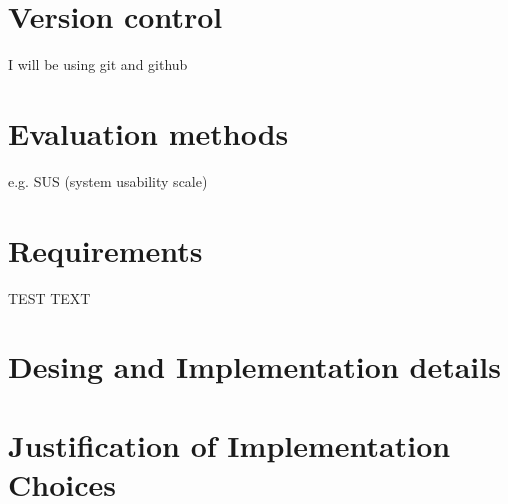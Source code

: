\section{Version control}
  I will be using git and github

\section{Evaluation methods}
  e.g. SUS (system usability scale)

\section{Requirements}
  TEST TEXT
\section{Desing and Implementation details}

\section{Justification of Implementation Choices}
